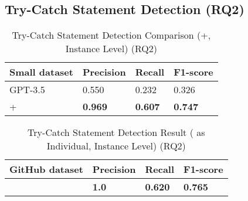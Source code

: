 \subsection{Try-Catch Statement Detection (RQ2)}
\label{sec:rq2}

\begin{table}[t]%
  \caption{Try-Catch Statement Detection Comparison ({\xblock}+{\xstate}, Instance Level) (RQ2)}
  \vspace{-12pt}
  \small
	\begin{center}
		\renewcommand{\arraystretch}{1}
		\begin{tabular}{| p{3.05cm}<{\centering} | p{1.2cm}<{\centering} | p{1.2cm}<{\centering}| p{1.2cm}<{\centering}|}
		  \hline
		Small dataset	  & Precision  & Recall & F1-score \\
			\hline
                        GPT-3.5 & 0.550 & 0.232 & 0.326 \\
			\hline
			\xblock + \xstate   & \textbf{0.969}  &  \textbf{0.607} & \textbf{0.747}\\
			\hline
		\end{tabular}
		\label{tab:xstate-1}
	\end{center}
\end{table}

\begin{table}[t]%
\caption{Try-Catch Statement Detection Result ({\xstate} as Individual, Instance Level) (RQ2)}
  \vspace{-12pt}
  \small
	\begin{center}
		\renewcommand{\arraystretch}{1}
		\begin{tabular}{| p{3.05cm}<{\centering} | p{1.2cm}<{\centering} | p{1.2cm}<{\centering}| p{1.2cm}<{\centering}|}
		  \hline
		GitHub dataset	  & Precision  & Recall & F1-score \\
			\hline
			\hline
			\xstate  & \textbf{1.0}  &  \textbf{0.620} & \textbf{0.765}\\
			\hline
		\end{tabular}
		\label{tab:xstate-2}
	\end{center}
\end{table}


